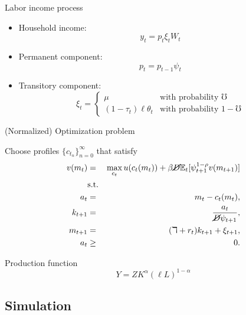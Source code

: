 \documentclass{beamer}
\begin{document}
\small
\begin{frame}{Labor income process}

\begin{itemize}
\item Household income: $$y_t = p_t \xi_t W_t$$
\item Permanent component: $$p_t = p_{t-1} \psi_t$$
\item Transitory component: $$\xi_t =
    \begin{cases}
       \mu & \text{with probability $\mho$} \\
      (1-\tau_t) \ell \theta_t & \text{with probability $1-\mho$}
   \end{cases}$$
\end{itemize}

\end{frame}

\footnotesize
\begin{frame}{(Normalized) Optimization problem}

Choose profiles $\{c_{t_n}\}_{n=0}^{\infty}$ that satisfy
 \begin{eqnarray*}
  v(m_t) &=& \max_{c_t} u(c_t(m_t)) + \beta \cancel{D} \mathbb{E}_{t}[\psi_{t+1}^{1-\rho}v(m_{t+1})] \\
  &\text{s.t.}& \\
  a_t &=& m_t - c_t(m_t), \\
  k_{t+1} &=& \frac{a_t}{\cancel{D}\psi_{t+1}}, \\
  m_{t+1} &=& (\daleth + r_t)k_{t+1} + \xi_{t+1}, \\
  a_t &\geq& 0.
\end{eqnarray*}

Production function $$Y = Z K^{\alpha} (\ell L)^{1-\alpha}$$ 

\end{frame}

\subsection{Simulation}
\end{document}
